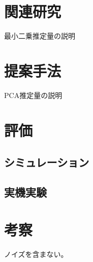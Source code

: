 \documentclass[a4j,10pt]{jsarticle}
\begin{document}
\section{関連研究}
最小二乗推定量の説明

\section{提案手法}
PCA推定量の説明

\section{評価}
\subsection{シミュレーション}
\subsection{実機実験}

\section{考察}
ノイズを含まない。



\end{document}
